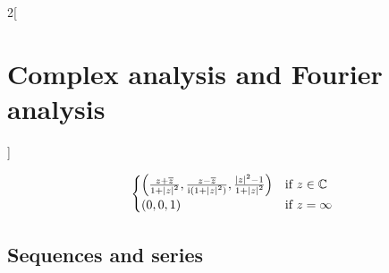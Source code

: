 \documentclass[../../../main.tex]{subfiles}
\begin{document}
\begin{multicols}{2}[\section{Complex analysis and Fourier analysis}]
\begin{definition}
$$\begin{cases}
        \left(\frac{z+\overline{z}}{1+\abs{z}^2},\frac{z-\overline{z}}{\mathrm{i}(1+{\abs{z}}^2)},\frac{{\abs{z}}^2-1}{1+{\abs{z}}^2}\right) & \text{if }z\in\mathbb{C}  \\
        (0,0,1)                                                                                                                       & \text{if }z=\infty
      \end{cases}$$
  \end{definition}
  \begin{center}
    \begin{minipage}{\linewidth}
      \centering
      
    \end{minipage}
  \end{center}
  \subsection{Sequences and series}

\end{multicols}
\end{document}
